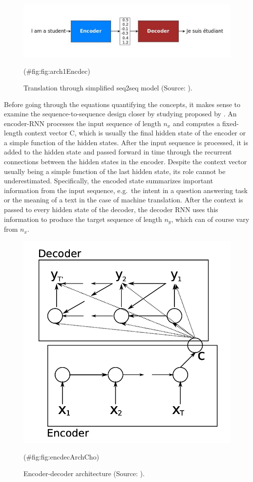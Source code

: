 \documentclass[
]{krantz}
\begin{document}
\begin{figure}

{\centering \includegraphics[width=0.85\linewidth]{./figures/01-01-nlp/encdec_arch1_deepl} 

}

\caption{Translation through simplified seq2seq model (Source: \citet{Manning2022}).}(\#fig:fig:arch1Encdec)
\end{figure}



Before going through the equations quantifying the concepts, it makes
sense to examine the sequence-to-sequence design closer by studying
proposed by \citep{Cho2014}. An encoder-RNN processes the input sequence of
length \(n_x\) and computes a fixed-length context vector C, which is
usually the final hidden state of the encoder or a simple function of
the hidden states. After the input sequence is processed, it is added to
the hidden state and passed forward in time through the recurrent
connections between the hidden states in the encoder. Despite the
context vector usually being a simple function of the last hidden state,
its role cannot be underestimated. Specifically, the encoded state
summarizes important information from the input sequence, e.g.~the
intent in a question answering task or the meaning of a text in the case
of machine translation. After the context is passed to every hidden
state of the decoder, the decoder RNN uses this information to produce
the target sequence of length \(n_y\), which can of course vary from
\(n_x\).

\begin{figure}

{\centering \includegraphics[width=0.56\linewidth]{./figures/01-01-nlp/encdec_arch_Cho} 

}

\caption{Encoder-decoder architecture (Source: \citet{Cho2014}).}(\#fig:fig:encdecArchCho)
\end{figure}
\end{document}
